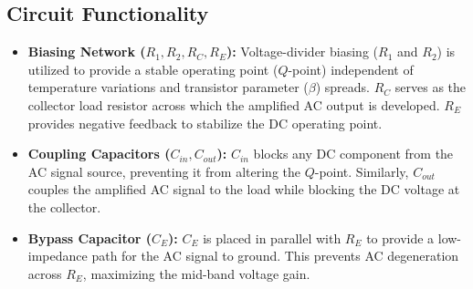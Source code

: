 \subsection{Circuit Functionality}
\begin{itemize}
	\item \textbf{Biasing Network ($R_1, R_2, R_C, R_E$):} Voltage-divider biasing ($R_1$ and $R_2$) is utilized to provide a stable operating point ($Q$-point) independent of temperature variations and transistor parameter ($\beta$) spreads. $R_C$ serves as the collector load resistor across which the amplified AC output is developed. $R_E$ provides negative feedback to stabilize the DC operating point.
	\item \textbf{Coupling Capacitors ($C_{in}, C_{out}$):} $C_{in}$ blocks any DC component from the AC signal source, preventing it from altering the $Q$-point. Similarly, $C_{out}$ couples the amplified AC signal to the load while blocking the DC voltage at the collector.
	\item \textbf{Bypass Capacitor ($C_E$):} $C_E$ is placed in parallel with $R_E$ to provide a low-impedance path for the AC signal to ground. This prevents AC degeneration across $R_E$, maximizing the mid-band voltage gain.
\end{itemize}

